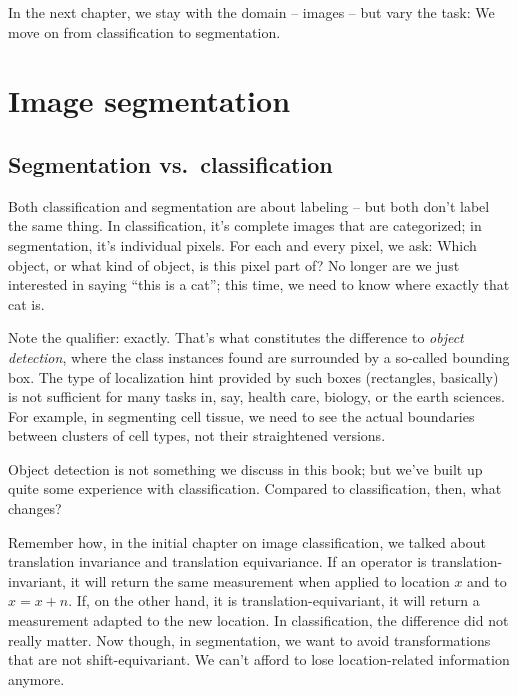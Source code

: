 \documentclass[
  letterpaper,
]{krantz}
\begin{document}
In the next chapter, we stay with the domain -- images -- but vary the
task: We move on from classification to segmentation.

\hypertarget{sec:image-segmentation}{%
\chapter{Image segmentation}\label{sec:image-segmentation}}

\hypertarget{segmentation-vs.-classification}{%
\section{Segmentation
vs.~classification}\label{segmentation-vs.-classification}}

Both classification and segmentation are about labeling -- but both
don't label the same thing. In classification, it's complete images that
are categorized; in segmentation, it's individual pixels. For each and
every pixel, we ask: Which object, or what kind of object, is this pixel
part of? No longer are we just interested in saying ``this is a cat'';
this time, we need to know where exactly that cat is.

Note the qualifier: exactly. That's what constitutes the difference to
\emph{object detection}, where the class instances found are surrounded
by a so-called bounding box. The type of localization hint provided by
such boxes (rectangles, basically) is not sufficient for many tasks in,
say, health care, biology, or the earth sciences. For example, in
segmenting cell tissue, we need to see the actual boundaries between
clusters of cell types, not their straightened versions.

Object detection is not something we discuss in this book; but we've
built up quite some experience with classification. Compared to
classification, then, what changes?

Remember how, in the initial chapter on image classification, we talked
about translation invariance and translation equivariance. If an
operator is translation-invariant, it
will return the same measurement when applied to location \(x\) and to
\(x=x+n\). If, on the other hand, it is translation-equivariant, it will
return a measurement adapted to the new location. In classification, the
difference did not really matter. Now though, in segmentation, we want
to avoid transformations that are not
shift-equivariant. We can't afford
to lose location-related information anymore.
\end{document}
